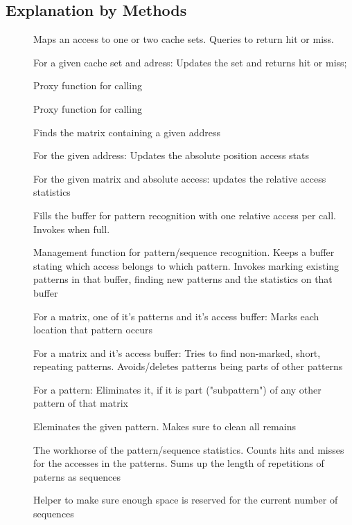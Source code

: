 \subsection{Explanation by Methods}

\begin{description} %
\item[] Maps an access to one or two cache sets. Queries  to return hit or miss.
\item[] For a given cache set and adress: Updates the set and returns hit or miss;
\item[] Proxy function for calling 
\item[] Proxy function for calling 
\item[] Finds the matrix containing a given address
\item[] For the given address: Updates the absolute position access stats
\item[] For the given matrix and absolute access: updates the relative access statistics
\item[] Fills the buffer for pattern recognition with one relative access per call. Invokes  when full.
\item[] Management function for pattern/sequence recognition. Keeps a buffer stating which access belongs to which pattern. Invokes marking existing patterns in that buffer, finding new patterns and the statistics on that buffer
\item[] For a matrix, one of it's patterns and it's access buffer: Marks each location that pattern occurs
\item[] For a matrix and it's access buffer: Tries to find non-marked, short, repeating patterns. Avoids/deletes patterns being parts of other patterns
\item[] For a pattern: Eliminates it, if it is part ("subpattern") of any other pattern of that matrix
\item[] Eleminates the given pattern. Makes sure to clean all remains
\item[] The workhorse of the pattern/sequence statistics. Counts hits and misses for the accesses in the patterns. Sums up the length of repetitions of paterns as sequences
\item[] Helper to make sure enough space is reserved for the current number of sequences

\end{description}

